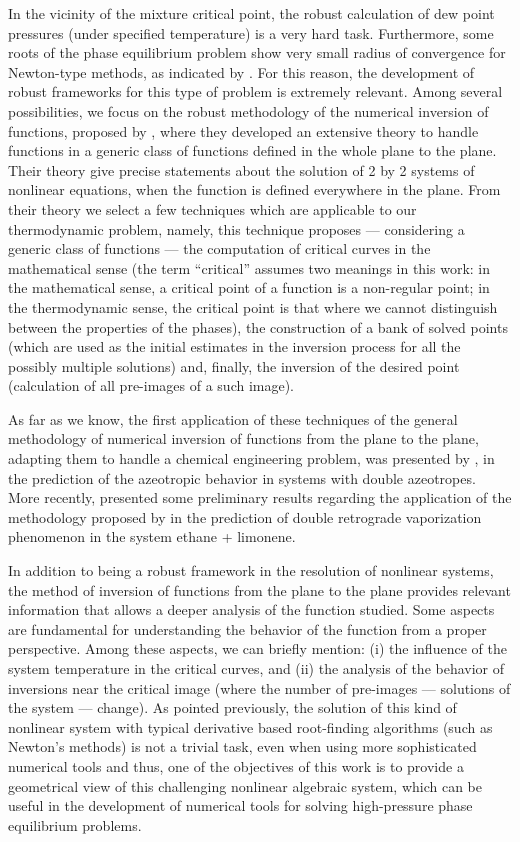 \documentclass[journal=iecred,manuscript=article]{achemso}
\theoremstyle{definition}
\theoremstyle{remark}
\begin{document}
In the vicinity of the mixture critical point, the robust calculation of dew point pressures (under specified temperature) is a very hard task. Furthermore, some roots of the phase equilibrium problem show very small radius of convergence for Newton-type methods, as indicated by \citet{jnsa}. For this reason, the development of robust frameworks for this type of problem is extremely relevant. Among several possibilities, we focus on the robust methodology of the numerical inversion of functions, proposed by \citet{malta}, where they developed an extensive theory to handle functions in a generic class of functions defined in the whole plane to the plane. Their theory give precise statements about the solution of 2 by 2 systems of nonlinear equations, when the function is defined everywhere in the plane. From their theory we select a few techniques which are applicable to our thermodynamic problem, namely, this technique \citep{malta} proposes --- considering a generic class of functions --- the computation of critical curves in the mathematical sense (the term \enquote{critical} assumes two meanings in this work: in the mathematical sense, a critical point of a function is a non-regular point; in the thermodynamic sense, the critical point is that where we cannot distinguish between the properties of the phases), the construction of a bank of solved points (which are used as the initial estimates in the inversion process for all the possibly multiple solutions) and, finally, the inversion of the desired point (calculation of all pre-images of a such image).
 
As far as we know, the first application of these techniques of the general methodology of numerical inversion of functions from the plane to the plane, adapting them to handle a chemical engineering problem, was presented by \citet{canadian}, in the prediction of the azeotropic behavior in systems with double azeotropes. More recently, \citet{ireme} presented some preliminary results regarding the application of the methodology proposed by \citet{malta} in the prediction of double retrograde vaporization phenomenon in the system ethane + limonene.

In addition to being a robust framework in the resolution of nonlinear systems, the method of inversion of functions from the plane to the plane provides relevant information that allows a deeper analysis of the function studied. Some aspects are fundamental for understanding the behavior of the function from a proper perspective. Among these aspects, we can briefly mention: (i) the influence of the system temperature in the critical curves, and (ii) the analysis of the behavior of inversions near the critical image (where the number of pre-images --- solutions of the system --- change). As pointed previously, the solution of this kind of nonlinear system with typical derivative based root-finding algorithms (such as Newton's methods) is not a trivial task, even when using more sophisticated numerical tools \cite{jnsa} and thus, one of the objectives of this work is to provide a geometrical view of this challenging nonlinear algebraic system, which can be useful in the development of numerical tools for solving high-pressure phase equilibrium problems.
\end{document}
